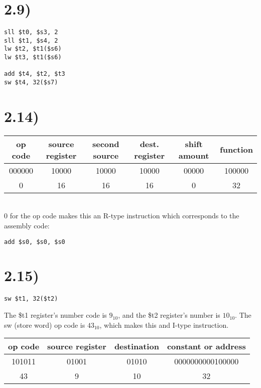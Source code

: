 \documentclass[a4paper,11pt]{article}
\begin{document}

\section*{2.9)} 

\begin{verbatim}
sll $t0, $s3, 2
sll $t1, $s4, 2
lw $t2, $t1($s6)
lw $t3, $t1($s6)

add $t4, $t2, $t3
sw $t4, 32($s7)
\end{verbatim}


\section*{2.14)} 

\begin{tabular}{| c | c | c | c | c | c |}
  \hline	
  op code & source register & second source & dest. register & shift amount & function \\  \hline  		
  000000 & 10000 & 10000 & 10000 & 00000 & 100000  \\ \hline
  0 & 16 & 16 & 16 & 0 & 32 \\ \hline
\end{tabular} \\

0 for the op code makes this an R-type instruction which corresponds to the assembly code:
\begin{verbatim}
add $s0, $s0, $s0
\end{verbatim}


\section*{2.15)} 

\begin{verbatim}
sw $t1, 32($t2)
\end{verbatim}

\noindent The \$t1 register's number code is $9_{10}$, and the \$t2 register's number is $10_{10}$.  The sw (store word) op code is $43_{10}$, which makes this and I-type instruction.
\\


\begin{tabular}{| c | c | c | c |}
  \hline	
  op code & source register & destination & constant or address\\  \hline  		
  101011 & 01001 & 01010 & 0000000000100000 \\ \hline
  43 & 9 & 10 & 32  \\ \hline
\end{tabular} \\
\end{document}
